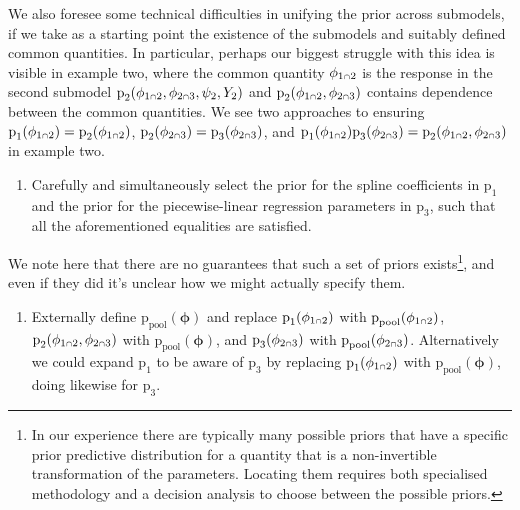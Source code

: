 \documentclass[
  10pt,
  a4paper,
]{article}
\providecommand{\tightlist}{%
  \setlength{\itemsep}{0pt}\setlength{\parskip}{0pt}}
\let\Oldcap\cap
\renewcommand{\cap}{\mathrel{\mathsmaller{\Oldcap}}}
\newcommand{\pd}{\text{p}}
\begin{document}
We also foresee some technical difficulties in unifying the prior across
submodels, if we take as a starting point the existence of the submodels
and suitably defined common quantities. In particular, perhaps our
biggest struggle with this idea is visible in example two, where the
common quantity \(\phi_{1 \cap 2}\) is the response in the second
submodel \(\pd_{2}(\phi_{1 \cap 2}, \phi_{2 \cap 3}, \psi_{2}, Y_{2})\)
and \(\pd_{2}(\phi_{1 \cap 2}, \phi_{2 \cap 3})\) contains dependence
between the common quantities. We see two approaches to ensuring
\(\pd_{1}(\phi_{1 \cap 2}) = \pd_{2}(\phi_{1 \cap 2})\),
\(\pd_{2}(\phi_{2 \cap 3}) = \pd_{3}(\phi_{2 \cap 3})\), and
\(\pd_{1}(\phi_{1 \cap 2})\pd_{3}(\phi_{2 \cap 3}) = \pd_{2}(\phi_{1 \cap 2}, \phi_{2 \cap 3})\)
in example two.

\begin{enumerate}
\def\labelenumi{\arabic{enumi}.}
\tightlist
\item
  Carefully and simultaneously select the prior for the spline
  coefficients in \(\pd_{1}\) and the prior for the piecewise-linear
  regression parameters in \(\pd_{3}\), such that all the aforementioned
  equalities are satisfied.
\end{enumerate}

We note here that there are no guarantees that such a set of priors
exists\footnote{In our experience there are typically many possible
  priors that have a specific prior predictive distribution for a
  quantity that is a non-invertible transformation of the parameters.
  Locating them requires both specialised methodology and a decision
  analysis to choose between the possible priors.}, and even if they did
it's unclear how we might actually specify them.

\begin{enumerate}
\def\labelenumi{\arabic{enumi}.}
\setcounter{enumi}{1}
\tightlist
\item
  Externally define \(\pd_{\text{pool}}(\boldsymbol{\phi})\) and replace
  \(\pd_{1}(\phi_{1 \cap 2})\) with
  \(\pd_{\text{pool}}(\phi_{1 \cap 2})\),
  \(\pd_{2}(\phi_{1 \cap 2}, \phi_{2 \cap 3})\) with
  \(\pd_{\text{pool}}(\boldsymbol{\phi})\), and
  \(\pd_{3}(\phi_{2 \cap 3})\) with
  \(\pd_{\text{pool}}(\phi_{2 \cap 3})\). Alternatively we could expand
  \(\pd_{1}\) to be aware of \(\pd_{3}\) by replacing
  \(\pd_{1}(\phi_{1 \cap 2})\) with
  \(\pd_{\text{pool}}(\boldsymbol{\phi})\), doing likewise for
  \(\pd_{3}\).
\end{enumerate}
\end{document}

